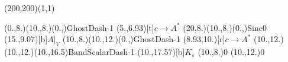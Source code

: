 \unitlength=1bp%

\begin{feynartspicture}(200,200)(1,1)

\FADiagram{}
\FAProp(0.,8.)(10.,8.)(0.,){GhostDash}{-1}
\FALabel(5.,6.93)[t]{$c\to A^*$}
\FAProp(20,8.)(10.,8.)(0.,){Sine}{0}
\FALabel(15.,9.07)[b]{$A|_V$}
\FAProp(10.,8.)(10.,12.)(0.,){GhostDash}{-1}
\FALabel(8.93,10.)[r]{$c\to A^*$}
\FAProp(10.,12.)(10.,12.)(10.,16.5){BandScalarDash}{-1}
\FALabel(10.,17.57)[b]{$K_\varepsilon$}
\FAVert(10.,8.){0}
\FAVert(10.,12.){0}
\end{feynartspicture}

